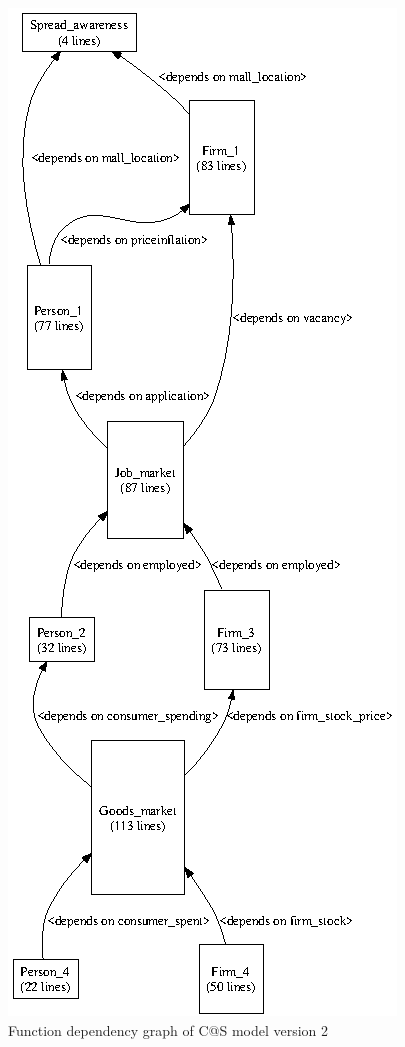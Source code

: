 \documentclass[a4paper,11pt]{article}
\begin{document}
\begin{figure}
\begin{center}
\includegraphics*[scale=1.5]{cats_dgraph_v2.eps}
\caption{Function dependency graph of C@S model version 2}
\label{fig:dg2}
\end{center}
\end{figure}
\end{document}
